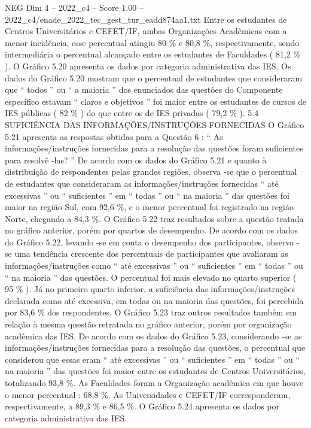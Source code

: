 \begin{textsample}{NEG Dim 4 – 2022\_c4 – Score 1.00 – 2022\_c4/enade\_2022\_tec\_gest\_tur\_eadd874aa1.txt}
Entre os estudantes de Centros Universitários e CEFET/IF, ambas Organizações Acadêmicas com a menor incidência, esse percentual atingiu 80 \% e 80,8 \%, respectivamente, sendo intermediária o percentual alcançado entre os estudantes de Faculdades ( 81,2 \% ).
O Gráfico 5.20 apresenta os dados por categoria administrativa das IES.
Os dados do Gráfico 5.20 mostram que o percentual de estudantes que consideraram que “ todos ” ou “ a maioria ” dos enunciados das questões do Componente específico estavam “ claros e objetivos ” foi maior entre os estudantes de cursos de IES públicas ( 82 \% ) do que entre os de IES privadas ( 79,2 \% ). 5.4 SUFICIÊNCIA DAS INFORMAÇÕES/INSTRUÇÕES FORNECIDAS O Gráfico 5.21 apresenta as respostas obtidas para a Questão 6 : “ As informações/instruções fornecidas para a resolução das questões foram suficientes para resolvê -las? ” De acordo com os dados do Gráfico 5.21 e quanto à distribuição de respondentes pelas grandes regiões, observa -se que o percentual de estudantes que consideraram as informações/instruções fornecidas “ até excessivas ” ou “ suficientes ” em “ todas ” ou “ na maioria ” das questões foi maior na região Sul, com 92,6 \%, e o menor percentual foi registrado na região Norte, chegando a 84,3 \%.
O Gráfico 5.22 traz resultados sobre a questão tratada no gráfico anterior, porém por quartos de desempenho.
De acordo com os dados do Gráfico 5.22, levando -se em conta o desempenho dos participantes, observa -se uma tendência crescente dos percentuais de participantes que avaliaram as informações/instruções como “ até excessivas ” ou “ suficientes ” em “ todas ” ou “ na maioria ” das questões.
O percentual foi mais elevado no quarto superior ( 95 \% ).
Já no primeiro quarto inferior, a suficiência das informações/instruções declarada como até excessiva, em todas ou na maioria das questões, foi percebida por 83,6 \% dos respondentes.
O Gráfico 5.23 traz outros resultados também em relação à mesma questão retratada no gráfico anterior, porém por organização acadêmica das IES.
De acordo com os dados do Gráfico 5.23, considerando -se as informações/instruções fornecidas para a resolução das questões, o percentual que considerou que essas eram “ até excessivas ” ou “ suficientes ” em “ todas ” ou “ na maioria ” das questões foi maior entre os estudantes de Centros Universitários, totalizando 93,8 \%.
As Faculdades foram a Organização acadêmica em que houve o menor percentual : 68,8 \%.
As Universidades e CEFET/IF corresponderam, respectivamente, a 89,3 \% e 86,5 \%.
O Gráfico 5.24 apresenta os dados por categoria administrativa das IES.

\end{textsample}
